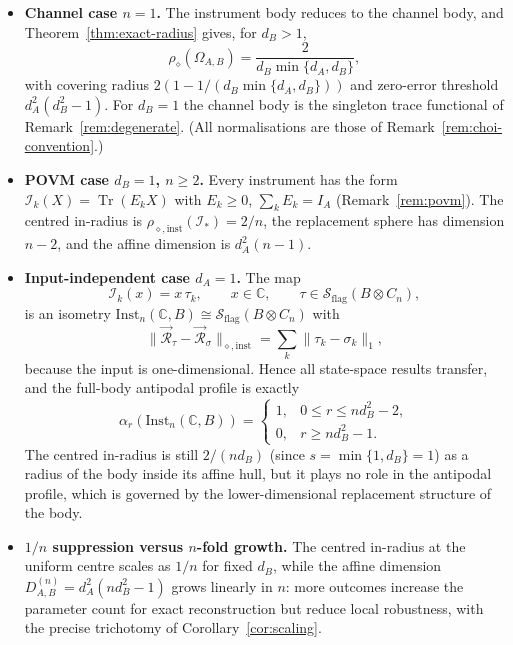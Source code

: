 \documentclass[11pt,a4paper]{article}
\newcommand{\Sstate}{\mathcal{S}}
\newcommand{\Inst}{\mathrm{Inst}}
\newcommand{\Tr}{\operatorname{Tr}}
\begin{document}
\begin{itemize}[leftmargin=*,itemsep=3pt]
\item \textbf{Channel case $n=1$.} The instrument body reduces to the channel body, and Theorem~\ref{thm:exact-radius} gives, for $d_B>1$,
\[
\rho_\diamond(\Omega_{A,B})=\frac{2}{d_B\min\{d_A,d_B\}},
\]
with covering radius $2(1-1/(d_B\min\{d_A,d_B\}))$ and zero-error threshold $d_A^2(d_B^2-1)$. For $d_B=1$ the channel body is the singleton trace functional of Remark~\ref{rem:degenerate}. (All normalisations are those of Remark~\ref{rem:choi-convention}.)

\item \textbf{POVM case $d_B=1$, $n\ge2$.} Every instrument has the form $\mathcal I_k(X)=\Tr(E_kX)$ with $E_k\ge0$, $\sum_kE_k=I_A$ (Remark~\ref{rem:povm}). The centred in-radius is $\rho_{\diamond,\mathrm{inst}}(\mathcal I_*)=2/n$, the replacement sphere has dimension $n-2$, and the affine dimension is $d_A^2(n-1)$.

\item \textbf{Input-independent case $d_A=1$.} The map
\[
\mathcal I_k(x)=x\,\tau_k,\qquad x\in\mathbb C,\qquad \tau\in\Sstate_{\mathrm{flag}}(B\otimes C_n),
\]
is an isometry $\Inst_n(\mathbb C,B)\cong\Sstate_{\mathrm{flag}}(B\otimes C_n)$ with
\[
\|\vec{\mathcal R}_\tau-\vec{\mathcal R}_\sigma\|_{\diamond,\mathrm{inst}}
=\sum_k\|\tau_k-\sigma_k\|_1,
\]
because the input is one-dimensional. Hence all state-space results transfer, and the full-body antipodal profile is exactly
\[
\alpha_r(\Inst_n(\mathbb C,B))=
\begin{cases}
1,&0\le r\le nd_B^2-2,\\
0,&r\ge nd_B^2-1.
\end{cases}
\]
The centred in-radius is still $2/(nd_B)$ (since $s=\min\{1,d_B\}=1$) as a radius of the body inside its affine hull, but it plays no role in the antipodal profile, which is governed by the lower-dimensional replacement structure of the body.

\item \textbf{$1/n$ suppression versus $n$-fold growth.} The centred in-radius at the uniform centre scales as $1/n$ for fixed $d_B$, while the affine dimension $D_{A,B}^{(n)}=d_A^2(nd_B^2-1)$ grows linearly in $n$: more outcomes increase the parameter count for exact reconstruction but reduce local robustness, with the precise trichotomy of Corollary~\ref{cor:scaling}.
\end{itemize}
\end{document}
